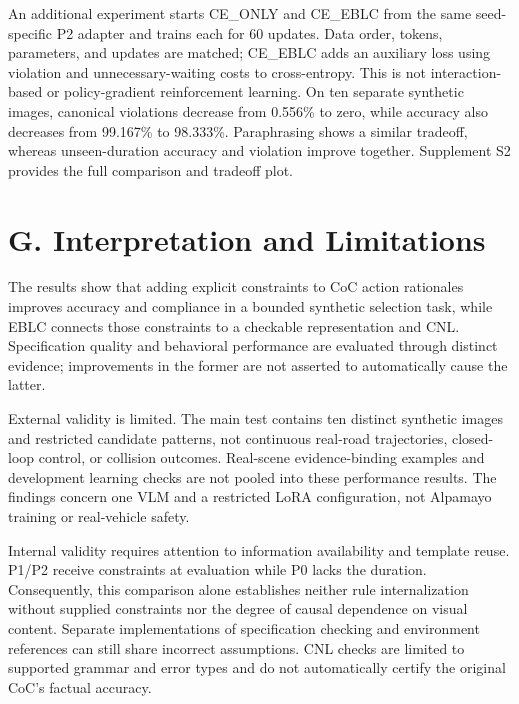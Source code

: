 \documentclass[11pt,a4paper]{article}
\begin{document}
An additional experiment starts CE\_ONLY and CE\_EBLC from the same seed-specific P2 adapter and trains each for 60 updates. Data order, tokens, parameters, and updates are matched; CE\_EBLC adds an auxiliary loss using violation and unnecessary-waiting costs to cross-entropy. This is not interaction-based or policy-gradient reinforcement learning. On ten separate synthetic images, canonical violations decrease from 0.556\% to zero, while accuracy also decreases from 99.167\% to 98.333\%. Paraphrasing shows a similar tradeoff, whereas unseen-duration accuracy and violation improve together. Supplement S2 provides the full comparison and tradeoff plot.\par

\section*{G. Interpretation and Limitations}

The results show that adding explicit constraints to CoC action rationales improves accuracy and compliance in a bounded synthetic selection task, while EBLC connects those constraints to a checkable representation and CNL. Specification quality and behavioral performance are evaluated through distinct evidence; improvements in the former are not asserted to automatically cause the latter.\par

External validity is limited. The main test contains ten distinct synthetic images and restricted candidate patterns, not continuous real-road trajectories, closed-loop control, or collision outcomes. Real-scene evidence-binding examples and development learning checks are not pooled into these performance results. The findings concern one VLM and a restricted LoRA configuration, not Alpamayo training or real-vehicle safety.\par

Internal validity requires attention to information availability and template reuse. P1/P2 receive constraints at evaluation while P0 lacks the duration. Consequently, this comparison alone establishes neither rule internalization without supplied constraints nor the degree of causal dependence on visual content. Separate implementations of specification checking and environment references can still share incorrect assumptions. CNL checks are limited to supported grammar and error types and do not automatically certify the original CoC's factual accuracy.\par
\end{document}

